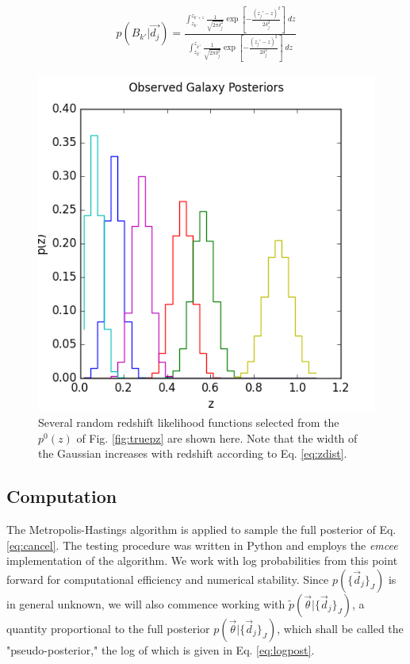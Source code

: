\documentclass[preprint]{aastex}
\begin{document}
\begin{eqnarray}
\label{eq:zdist}
p(B_{k'}|\vec{d_{j}}) = \frac{\int_{z_{k'}}^{z_{k'+1}} \frac{1}{\sqrt{2\pi\delta_{j}^{2}}}\exp\left[-\frac{(z_{j}'-z)^{2}}{2\delta_{j}^{2}}\right]\ dz}{\int_{z_{k^{-}}}^{z_{k^{+}}} \frac{1}{\sqrt{2\pi\delta_{j}^{2}}}\exp\left[-\frac{(z_{j}'-z)^{2}}{2\delta_{j}^{2}}\right]\ dz}
\end{eqnarray}

\begin{figure}
\includegraphics[width=\textwidth]{samplepzs.png}
\caption{Several random redshift likelihood functions selected from the $p^{0}(z)$ of Fig. \ref{fig:truepz} are shown here.  Note that the width of the Gaussian increases with redshift according to Eq. \ref{eq:zdist}.}
\label{fig:pzs}
\end{figure}

\subsection{Computation}
\label{sec:mcmc}

The Metropolis-Hastings algorithm is applied to sample the full posterior of Eq. \ref{eq:cancel}.  The testing procedure was written in Python and employs the \textit{emcee} implementation of the algorithm.  \citep{for12}  We work with log probabilities from this point forward for computational efficiency and numerical stability.  Since $p(\{\vec{d}_{j}\}_{J})$ is in general unknown, we will also commence working with $\tilde{p}(\vec{\theta}|\{\vec{d}_{j}\}_{J})$, a quantity proportional to the full posterior $p(\vec{\theta}|\{\vec{d}_{j}\}_{J})$, which shall be called the "pseudo-posterior," the log of which is given in Eq. \ref{eq:logpost}.
\end{document}

